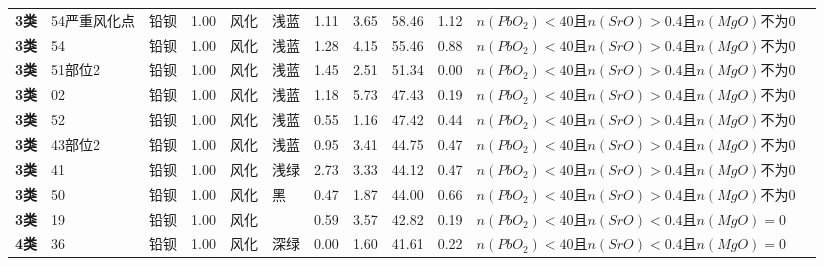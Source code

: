 \documentclass[withoutpreface,bwprint]{cumcmthesis} %
\begin{document}
\begin{appendices}
\begin{table}[!h]
\begin{tabular}{@{}llllllllllll@{}}
			\textbf{3类} & 54严重风化点        & 铅钡          & 1.00      & 风化            & 浅蓝          & 1.11              & 3.65                & 58.46             & 1.12              & $n(PbO_2)<40$且$n(SrO)>0.4$且$n(MgO)不为0$ &           \\
			\textbf{3类} & 54             & 铅钡          & 1.00      & 风化            & 浅蓝          & 1.28              & 4.15                & 55.46             & 0.88              & $n(PbO_2)<40$且$n(SrO)>0.4$且$n(MgO)不为0$ &           \\
			\textbf{3类} & 51部位2          & 铅钡          & 1.00      & 风化            & 浅蓝          & 1.45              & 2.51                & 51.34             & 0.00              & $n(PbO_2)<40$且$n(SrO)>0.4$且$n(MgO)不为0$ &           \\
			\textbf{3类} & 02             & 铅钡          & 1.00      & 风化            & 浅蓝          & 1.18              & 5.73                & 47.43             & 0.19              & $n(PbO_2)<40$且$n(SrO)>0.4$且$n(MgO)不为0$ &           \\
			\textbf{3类} & 52             & 铅钡          & 1.00      & 风化            & 浅蓝          & 0.55              & 1.16                & 47.42             & 0.44              & $n(PbO_2)<40$且$n(SrO)>0.4$且$n(MgO)不为0$ &           \\
			\textbf{3类} & 43部位2          & 铅钡          & 1.00      & 风化            & 浅蓝          & 0.95              & 3.41                & 44.75             & 0.47              & $n(PbO_2)<40$且$n(SrO)>0.4$且$n(MgO)不为0$ &           \\
			\textbf{3类} & 41             & 铅钡          & 1.00      & 风化            & 浅绿          & 2.73              & 3.33                & 44.12             & 0.47              & $n(PbO_2)<40$且$n(SrO)>0.4$且$n(MgO)不为0$ &           \\
			\textbf{3类} & 50             & 铅钡          & 1.00      & 风化            & 黑           & 0.47              & 1.87                & 44.00             & 0.66              & $n(PbO_2)<40$且$n(SrO)>0.4$且$n(MgO)不为0$ &           \\
			\textbf{3类} & 19             & 铅钡          & 1.00      & 风化            &             & 0.59              & 3.57                & 42.82             & 0.19              & $n(PbO_2)<40$且$n(SrO)<0.4$且$n(MgO)=0$  &           \\
			\textbf{4类} & 36             & 铅钡          & 1.00      & 风化            & 深绿          & 0.00              & 1.60                & 41.61             & 0.22              & $n(PbO_2)<40$且$n(SrO)<0.4$且$n(MgO)=0$  &           \\

\end{tabular}
\end{table}
\end{appendices}
\end{document}
